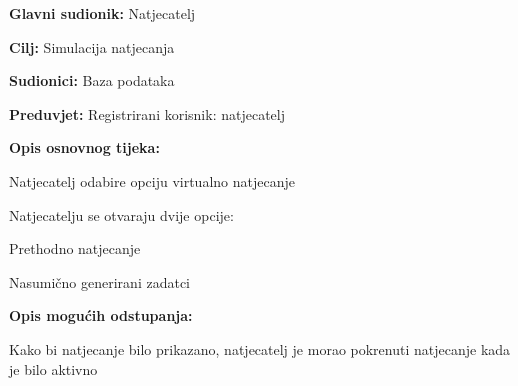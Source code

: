 					\noindent {}
					\begin{packed_item}
						
						\item \textbf{Glavni sudionik: } Natjecatelj
						\item  \textbf{Cilj:} Simulacija natjecanja
						\item  \textbf{Sudionici:} Baza podataka
						\item  \textbf{Preduvjet:}  Registrirani korisnik: natjecatelj
						\item  \textbf{Opis osnovnog tijeka:}
						
						\item[] \begin{packed_enum}
							\item Natjecatelj odabire opciju virtualno natjecanje
							\item Natjecatelju se otvaraju dvije opcije:
							\item[] \begin{packed_enum}
								
								\item Prethodno natjecanje
								\item Nasumično generirani zadatci 
								
							\end{packed_enum}
						\end{packed_enum}
						\item  \textbf{Opis mogućih odstupanja:  } 
						\item[] \begin{packed_enum}
							
							\item[2.a] Kako bi natjecanje bilo prikazano, natjecatelj je morao pokrenuti natjecanje kada je bilo aktivno 
							
						\end{packed_enum}
					\end{packed_item}										
					
